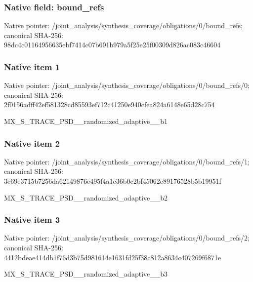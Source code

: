 \documentclass[10pt,a4paper]{article}
\begin{document}
\subsubsection{Native field: bound\_\allowbreak{}refs}
Native pointer: /joint\_\allowbreak{}analysis/synthesis\_\allowbreak{}coverage/obligations/0/bound\_\allowbreak{}refs; canonical SHA-256: 98dc4c01164956635ebf7414c07b691b979a5f25e25f00309d826ac083c46604

\subsubsection{Native item 1}
Native pointer: /joint\_\allowbreak{}analysis/synthesis\_\allowbreak{}coverage/obligations/0/bound\_\allowbreak{}refs/0; canonical SHA-256: 2f0156adff42ef581328cd85593ef712c41250e940cfea824a6148e65d28c754

\begingroup\raggedright\sloppy MX\_\allowbreak{}S\_\allowbreak{}TRACE\_\allowbreak{}PSD\_\allowbreak{}\_\allowbreak{}randomized\_\allowbreak{}adaptive\_\allowbreak{}\_\allowbreak{}b1\par\endgroup

\subsubsection{Native item 2}
Native pointer: /joint\_\allowbreak{}analysis/synthesis\_\allowbreak{}coverage/obligations/0/bound\_\allowbreak{}refs/1; canonical SHA-256: 3e69e3715b7256da62149876e495f4a1e36b0c2bf45062c89176528b5b19951f

\begingroup\raggedright\sloppy MX\_\allowbreak{}S\_\allowbreak{}TRACE\_\allowbreak{}PSD\_\allowbreak{}\_\allowbreak{}randomized\_\allowbreak{}adaptive\_\allowbreak{}\_\allowbreak{}b2\par\endgroup

\subsubsection{Native item 3}
Native pointer: /joint\_\allowbreak{}analysis/synthesis\_\allowbreak{}coverage/obligations/0/bound\_\allowbreak{}refs/2; canonical SHA-256: 4412bdeae414db1f76d3b75d981614e1631fd25f38c812a8634c407269f6871e

\begingroup\raggedright\sloppy MX\_\allowbreak{}S\_\allowbreak{}TRACE\_\allowbreak{}PSD\_\allowbreak{}\_\allowbreak{}randomized\_\allowbreak{}adaptive\_\allowbreak{}\_\allowbreak{}b3\par\endgroup
\end{document}
